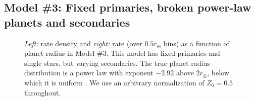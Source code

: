 \documentclass[12pt,modern]{aastex61}
\begin{document}

\subsection{Model \#3: Fixed primaries, broken power-law planets and 
secondaries}
\label{sec:model_3}

\begin{figure}[!tb]
    \centering
    \caption{
        {\it Left:} rate density and {\it right:} rate (over $0.5r_\oplus$ 
        bins) as a function of planet radius in Model \#3. This model has 
        fixed primaries 
        and 
        single stars, but varying secondaries. The true planet radius 
        distribution is 
        a power law with exponent $-2.92$ above $2r_\oplus$, below which it is 
        uniform 
        \citep[similar to][]{howard_planet_2012}. We use an arbitrary 
        normalization of 
        $Z_0=0.5$ throughout.}
    \label{fig:occ_rate_model_3_log}
\end{figure}
\end{document}
